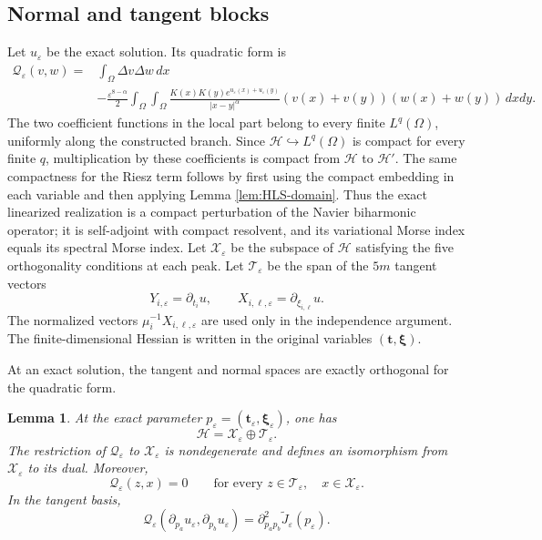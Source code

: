 \documentclass[11pt]{article}
\newtheorem{lemma}[theorem]{Lemma}
\numberwithin{equation}{section}
\begin{document}
\subsection{Normal and tangent blocks}

Let $u_\varepsilon$ be the exact solution. Its quadratic form is
\begin{equation*}
\begin{aligned}
\mathcal Q_\varepsilon(v,w)
={}&\int_\Omega\Delta v\Delta w\,dx\\
&-\frac{\varepsilon^{8-\alpha}}2
\int_\Omega\int_\Omega
\frac{K(x)K(y)e^{u_\varepsilon(x)+u_\varepsilon(y)}}{|x-y|^\alpha}
(v(x)+v(y))(w(x)+w(y))\,dxdy.
\end{aligned}
\end{equation*}
The two coefficient functions in the local part belong to every
finite $L^q(\Omega)$, uniformly along the constructed branch. Since
$\mathcal H\hookrightarrow L^q(\Omega)$ is compact for every finite
$q$, multiplication by these coefficients is compact from
$\mathcal H$ to $\mathcal H'$. The same compactness for the Riesz
term follows by first using the compact embedding in each variable
and then applying Lemma \ref{lem:HLS-domain}. Thus the exact
linearized realization is a compact perturbation of the Navier
biharmonic operator; it is self-adjoint with compact resolvent, and
its variational Morse index equals its spectral Morse index.
Let $\mathcal X_\varepsilon$ be the subspace of $\mathcal H$ satisfying the five orthogonality conditions at each peak. Let $\mathcal T_\varepsilon$ be the span of the $5m$ tangent
vectors
\[
Y_{i,\varepsilon}=\partial_{t_i}u,
\qquad
X_{i,\ell,\varepsilon}=\partial_{\xi_{i,\ell}}u.
\]
The normalized vectors
$\mu_i^{-1}X_{i,\ell,\varepsilon}$ are used only in the
independence argument. The finite-dimensional Hessian is written in
the original variables $(\boldsymbol t,\boldsymbol\xi)$.

At an exact solution, the tangent and normal spaces are exactly orthogonal for the quadratic form.

\begin{lemma}\label{lem:tangent-normal-reduction}
At the exact parameter
$p_\varepsilon=(\boldsymbol t_\varepsilon,\boldsymbol\xi_\varepsilon)$,
one has
\begin{equation}\label{eq:tangent-normal-direct-sum}
\mathcal H=\mathcal X_\varepsilon\oplus\mathcal T_\varepsilon.
\end{equation}
The restriction of $\mathcal Q_\varepsilon$ to
$\mathcal X_\varepsilon$ is nondegenerate and defines an isomorphism
from $\mathcal X_\varepsilon$ to its dual. Moreover,
\begin{equation}\label{eq:exact-tangent-normal-orthogonality}
\mathcal Q_\varepsilon(z,x)=0
\qquad
\text{for every }z\in\mathcal T_\varepsilon,\quad
x\in\mathcal X_\varepsilon.
\end{equation}
In the tangent basis,
\begin{equation}\label{eq:tangent-Hessian-exact}
\mathcal Q_\varepsilon
(\partial_{p_a}u_\varepsilon,\partial_{p_b}u_\varepsilon)
=
\partial_{p_ap_b}^2
\widetilde J_\varepsilon(p_\varepsilon).
\end{equation}
\end{lemma}
\end{document}
